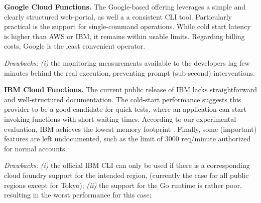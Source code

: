 \textbf{Google Cloud Functions.} The Google-based offering leverages a simple and clearly structured web-portal, as well a a consistent \gls{CLI} tool. 
Particularly practical is the support for single-command operations. 
While cold start latency is higher than AWS or IBM, it remains within usable limits. 
Regarding billing costs, Google is the least convenient operator.

\emph{Drawbacks:}
\emph{(i)} the monitoring measurements available to the developers lag few minutes behind the real execution, preventing prompt (\eg sub-second) interventions.
 

\textbf{IBM Cloud Functions.}
The current public release of IBM lacks straightforward and well-structured documentation.
The cold-start performance suggests this provider to be a good candidate for quick tests, where an application can start invoking functions with short waiting times.
According to our experimental evaluation, IBM achieves the lowest memory footprint .
Finally, some (important) features are left undocumented, such as the limit of 3000 req/minute authorized for normal accounts.

\emph{Drawbacks:}
\emph{(i)} the official IBM \gls{CLI} can only be used if there is a corresponding cloud foundry support for the intended region, (currently the case for all public regions except for Tokyo);
\emph{(ii)} the support for the Go runtime is rather poor, resulting in the worst performance for this case;
 

